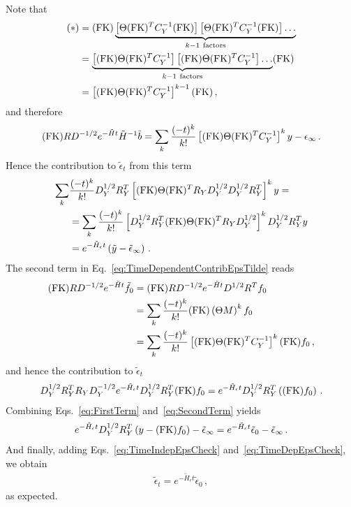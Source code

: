 \documentclass[11pt]{article}
\begin{document}
Note that 
\begin{align}
    (*) &= \FKtab \underbrace{\left[\Theta \FKtabT C_Y^{-1} \FKtab\right] \left[\Theta \FKtabT C_Y^{-1} \FKtab\right] \ldots }_{k-1\ \mathrm{factors}} \\
    &= \underbrace{ \left[\FKtab \Theta \FKtabT C_Y^{-1}\right] \left[\FKtab\Theta \FKtabT C_Y^{-1}\right] \ldots }_{k-1\ \mathrm{factors}}  \FKtab\\
    &= \left[\FKtab \Theta \FKtabT C_Y^{-1}\right]^{k-1} \FKtab\, ,
\end{align}
and therefore 
\begin{align}
    (\mathrm{FK}) R D^{-1/2} e^{-\tilde{H}t} \tilde{H}^{-1} \tilde{b} = 
        \sum_k \frac{(-t)^k}{k!} \left[(\mathrm{FK}) \Theta (\mathrm{FK})^T C_Y^{-1}\right]^k y - \epsilon_\infty\, .
\end{align}
Hence the contribution to $\tilde{\epsilon}_t$ from this term
\begin{align}
    \sum_k & \frac{(-t)^k}{k!} D_Y^{1/2} R_Y^T \left[(\mathrm{FK}) \Theta (\mathrm{FK})^T R_Y D_Y^{1/2} D_Y^{1/2} R_Y^T\right]^k y = \nonumber \\
        &= \sum_k \frac{(-t)^k}{k!} \left[D_Y^{1/2} R_Y^T (\mathrm{FK}) \Theta (\mathrm{FK})^T R_Y D_Y^{1/2} \right]^k D_Y^{1/2} R_Y^T y \nonumber \\
        \label{eq:FirstTerm}
        &= e^{-\tilde{H}_\epsilon t} \left(\tilde{y} - \tilde{\epsilon}_\infty\right)\, .
\end{align}
The second term in Eq.~\ref{eq:TimeDependentContribEpsTilde} reads
\begin{align}
    (\mathrm{FK}) R D^{-1/2} e^{-\tilde{H}t} \tilde{f}_0 
        &= (\mathrm{FK}) R D^{-1/2} e^{-\tilde{H}t} D^{1/2} R^T f_0 \\
        &=  \sum_k \frac{(-t)^k}{k!} (\mathrm{FK}) \left(\Theta M\right)^k f_0 \\
        &= \sum_k \frac{(-t)^k}{k!} \left[(\mathrm{FK}) \Theta (\mathrm{FK})^T C_Y^{-1}\right]^k (\mathrm{FK}) f_0 \, ,
\end{align}
and hence the contribution to $\tilde{\epsilon}_t$
\begin{align}
    \label{eq:SecondTerm}
    D_Y^{1/2} R_Y^T R_Y D_Y^{-1/2} e^{-\tilde{H}_\epsilon t} D_Y^{1/2} R_Y^T (\mathrm{FK}) f_0
        = e^{-\tilde{H}_\epsilon t} D_Y^{1/2} R_Y^T \left((\mathrm{FK}) f_0\right)\, .
\end{align}
Combining Eqs.~\ref{eq:FirstTerm} and~\ref{eq:SecondTerm} yields
\begin{align}
    \label{eq:TimeDepEpsCheck}
    e^{-\tilde{H}_\epsilon t} D_Y^{1/2} R_Y^T \left(y - (\mathrm{FK}) f_0\right) - \tilde{\epsilon}_\infty = 
    e^{-\tilde{H}_\epsilon t} \tilde{\epsilon}_0 - \tilde{\epsilon}_\infty\, .
\end{align}
And finally, adding Eqs.~\ref{eq:TimeIndepEpsCheck} and~\ref{eq:TimeDepEpsCheck}, we obtain
\begin{align}
    \label{eq:FinalResultEvolutionCheck}   
    \tilde{\epsilon}_t =  e^{-\tilde{H}_\epsilon t} \tilde{\epsilon}_0 \, ,
\end{align}
as expected.
\end{document}
